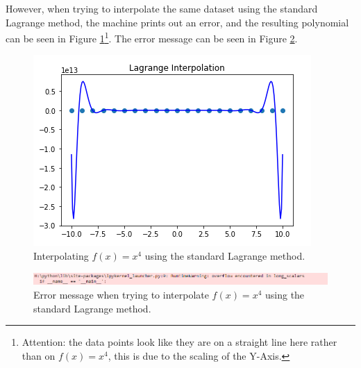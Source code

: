 \documentclass[a4paper,11pt, notitlepage]{article}
\begin{document}
\begin{onehalfspace}
However, when trying to interpolate the same dataset using the standard Lagrange method, the machine prints out an error, and the resulting polynomial can be seen in Figure \ref{fig:lag-x4}\footnote{Attention: the data points look like they are on a straight line here rather than on $f(x)=x^4$, this is due to the scaling of the Y-Axis.}. The error message can be seen in Figure \ref{fig:lag-x4-error}.

 \begin{figure}[H]
	\centering
	\includegraphics[width=\textwidth]{./images/lag-x4.png}
	\caption{Interpolating $f(x)=x^4$ using the standard Lagrange method.} 
	\label{fig:lag-x4}
\end{figure}

 \begin{figure}[H]
	\centering
	\includegraphics[width=\textwidth]{./images/lag-x4-error.png}
	\caption{Error message when trying to interpolate $f(x)=x^4$ using the standard Lagrange method.}
	\label{fig:lag-x4-error}
\end{figure}



\end{onehalfspace}
\end{document}
